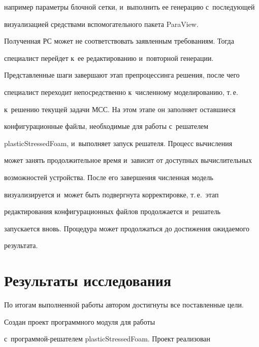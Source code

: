 например па\-ра\-мет\-ры блоч\-ной сетки, и~выполнить ее генерацию с~последующей 


визуализацией средствами вспомогательного пакета \mbox{ParaView}. 


Полученная РС может не соответствовать заявленным требованиям. Тогда 


специалист перейдет к~ее редактированию и~повторной генерации.








   


   


   


   Представленные шаги завершают этап препроцессинга решения, после чего 


специалист переходит непосредственно к~численному моделированию, т.\,е.\ 


к~решению текущей задачи МСС. На этом этапе он заполняет оставшиеся 


конфигурационные файлы, необходимые для работы с~решателем 


\mbox{plasticStressedFoam}, и~выполняет запуск решателя. Процесс вычисления 


может занять продолжительное время и~зависит от доступных вычислительных 


возможностей устройства. После его завершения численная модель 


визуализируется и~может быть подвергнута корректировке, т.\,е.\ этап 


редактирования конфигурационных файлов продолжается и~решатель 


запускается вновь. Процедура может продолжаться до достижения ожи\-да\-емо\-го 


результата.





\section{Результаты исследования }





   По итогам выполненной работы автором достигнуты все по\-став\-лен\-ные цели. 


Создан проект программного модуля для работы  


с~про\-грам\-мой-ре\-ша\-те\-лем \mbox{plasticStressedFoam}. Проект реализован 


